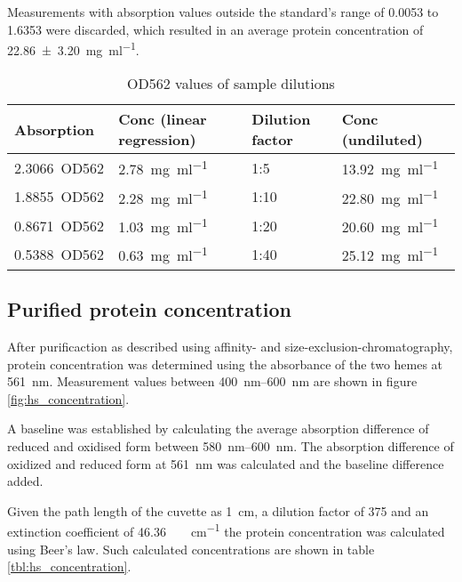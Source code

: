 Measurements with absorption values outside the standard's range of 0.0053 to
1.6353 were discarded, which resulted in an average protein concentration of
\SI{22.86 \pm 3.20}{\mg\per\ml}.

\begin{table*}
	\centering
	\begin{tabu}{llll}
		\toprule
		Absorption & Conc (linear regression) & Dilution factor & Conc (undiluted) \\
		\midrule
		\SI{2.3066}{OD562} & \SI{2.78}{\mg\per\ml} & 1:5  & \SI{13.92}{\mg\per\ml} \\
		\SI{1.8855}{OD562} & \SI{2.28}{\mg\per\ml} & 1:10 & \SI{22.80}{\mg\per\ml} \\
		\SI{0.8671}{OD562} & \SI{1.03}{\mg\per\ml} & 1:20 & \SI{20.60}{\mg\per\ml} \\
		\SI{0.5388}{OD562} & \SI{0.63}{\mg\per\ml} & 1:40 & \SI{25.12}{\mg\per\ml} \\
		\bottomrule
	\end{tabu}
	\caption{OD562 values of sample dilutions}
	\label{tbl:bca_absorption_sample}
\end{table*}

\subsection{Purified protein concentration}

After purificaction as described using affinity\hyp{} and
size\hyp{}exclusion\hyp{}chromatography, protein concentration was determined
using the absorbance of the two hemes at \SI{561}{\nm}.
Measurement values between \SIrange{400}{600}{\nm} are shown in figure
\ref{fig:hs_concentration}.

A baseline was established by calculating the average absorption difference of
reduced and oxidised form between \SIrange{580}{600}{\nm}. The absorption
difference of oxidized and reduced form at \SI{561}{\nm} was calculated and the
baseline difference added.

Given the path length of the cuvette as \SI{1}{\cm}, a dilution factor of 375
and an extinction coefficient of \SI{46.36}{\per\milli\Molar\per\cm} the
protein concentration was calculated using Beer's law. Such calculated
concentrations are shown in table \ref{tbl:hs_concentration}.

